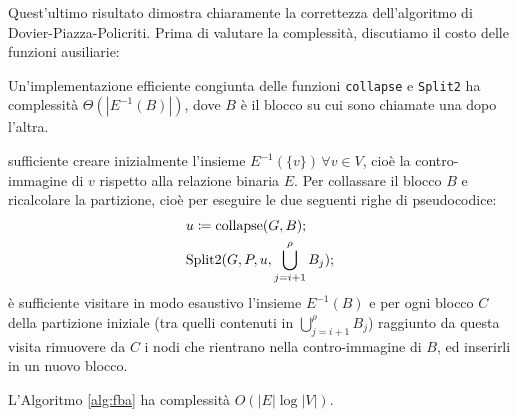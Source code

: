Quest'ultimo risultato dimostra chiaramente la correttezza dell'algoritmo di Dovier-Piazza-Policriti. Prima di valutare la complessità, discutiamo il costo delle funzioni ausiliarie:
\begin{observation}
    Un'implementazione efficiente congiunta delle funzioni \texttt{collapse} e \texttt{Split2} ha complessità $\Theta(|E^{-1}(B)|)$, dove $B$ è il blocco su cui sono chiamate una dopo l'altra.
\end{observation}
\begin{proof2}
    \accente sufficiente creare inizialmente l'insieme $E^{-1}(\{v\}) \, \forall v \in V$, cioè la contro-immagine di $v$ rispetto alla relazione binaria $E$. Per collassare il blocco $B$ e ricalcolare la partizione, cioè per eseguire le due seguenti righe di pseudocodice:
    \begin{align*}
        &u \coloneqq \textup{collapse}(G,B);\\
        &\textup{Split2}(G, P, u, \bigcup_{j=i+1}^\rho B_j);
    \end{align*}
    è sufficiente visitare in modo esaustivo l'insieme $E^{-1}(B)$ e per ogni blocco $C$ della partizione iniziale (tra quelli contenuti in $\bigcup_{j=i+1}^\rho B_j$) raggiunto da questa visita rimuovere da $C$ i nodi che rientrano nella contro-immagine di $B$, ed inserirli in un nuovo blocco.
\end{proof2}
\begin{theorem}
    L'Algoritmo \ref{alg:fba} ha complessità $O(|E| \log |V|)$.
\end{theorem}
